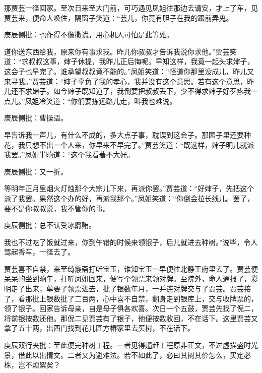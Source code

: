 \begin{parag}


    那贾芸一径回家。至次日来至大门前，可巧遇见凤姐往那边去请安，才上了车，见贾芸来，便命人唤住，隔窗子笑道：“芸儿，你竟有胆子在我的跟前弄鬼。\begin{note}庚辰侧批：也作得不像撒谎，用心机人可怕是此等处。\end{note}道你送东西给我，原来你有事求我。昨儿你叔叔才告诉我说你求他。”贾芸笑道：“求叔叔这事，婶子休提，我昨儿正后悔呢。早知这样，我竟一起头求婶子，这会子也早完了。谁承望叔叔竟不能的。”凤姐笑道：“怪道你那里没成儿，昨儿又来寻我。”贾芸道：“婶子辜负了我的孝心，我并没有这个意思。若有这个意思，昨儿还不求婶子。如今婶子既知道了，我倒要把叔叔丢下，少不得求婶子好歹疼我一点儿。”凤姐冷笑道：“你们要拣远路儿走，叫我也难说。\begin{note}庚辰侧批：曹操语。\end{note}早告诉我一声儿，有什么不成的，多大点子事，耽误到这会子。那园子里还要种花，我只想不出一个人来，你早来不早完了。”贾芸笑道：“既这样，婶子明儿就派我罢。”凤姐半晌道：“这个我看著不大好。\begin{note}庚辰侧批：又一折。\end{note}等明年正月里烟火灯烛那个大宗儿下来，再派你罢。”贾芸道：“好婶子，先把这个派了我罢。果然这个办的好，再派我那个。”凤姐笑道：“你倒会拉长线儿。罢了，要不是你叔叔说，我不管你的事。\begin{note}庚辰侧批：总不认受冰麝贿。\end{note}我也不过吃了饭就过来，你到午错的时候来领银子，后儿就进去种树。”说毕，令人驾起香车，一径去了。
\end{parag}


\begin{parag}


    贾芸喜不自禁，来至绮霰斋打听宝玉，谁知宝玉一早便往北静王府里去了。贾芸便呆呆的坐到晌午，打听凤姐回来，便写个领票来领对牌。至院外，命人通报了，彩明走了出来，单要了领票进去，批了银数年月，一并连对牌交与了贾芸。贾芸接了，看那批上银数批了二百两，心中喜不自禁，翻身走到银库上，交与收牌票的，领了银子。回家告诉母亲，自是母子俱各欢喜。次日一个五鼓，贾芸先找了倪二，将前银按数还他。那倪二见贾芸有了银子，他便按数收回，不在话下。这里贾芸又拿了五十两，出西门找到花儿匠方椿家里去买树，不在话下。\begin{note}庚辰双行夹批：至此便完种树工程。一者见得趱赶工程原非正文，不过虚描盛时光景，借此以出情文。二者又为避难法。若不如此了，必曰其树其价怎么，买定必株，岂不烦絮矣？\end{note}
\end{parag}


